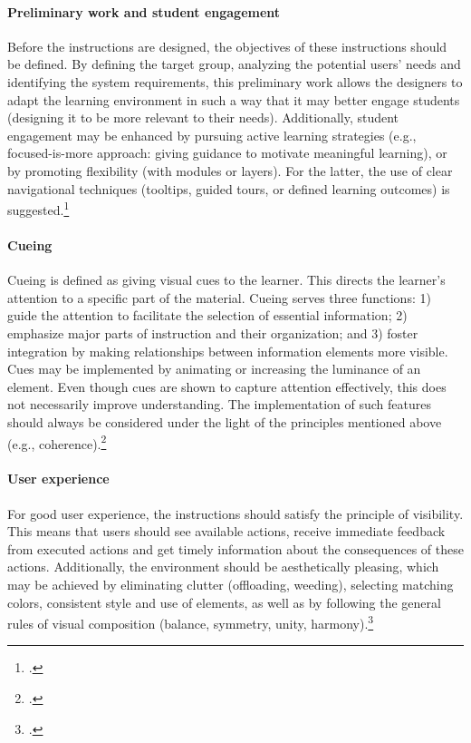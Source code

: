 \paragraph{Preliminary work and student engagement} Before the instructions are designed, the objectives of these instructions should be defined. By defining the target group, analyzing the potential users' needs and identifying the system requirements, this preliminary work allows the designers to adapt the learning environment in such a way that it may better engage students (designing it to be more relevant to their needs). Additionally, student engagement may be enhanced by pursuing active learning strategies (e.g., focused-is-more approach: giving guidance to motivate meaningful learning), or by promoting flexibility (with modules or layers). For the latter, the use of clear navigational techniques (tooltips, guided tours, or defined learning outcomes) is suggested.\footcites[Cf.][p.202]{BlummerBestPracticesCreating2009}

\paragraph{Cueing} Cueing is defined as giving visual cues to the learner. This directs the learner's attention to a specific part of the material. Cueing serves three functions: 1) guide the attention to facilitate the selection of essential information; 2) emphasize major parts of instruction and their organization; and 3) foster integration by making relationships between information elements more visible. Cues may be implemented by animating or increasing the luminance of an element. Even though cues are shown to capture attention effectively, this does not necessarily improve understanding. The implementation of such features should always be considered under the light of the principles mentioned above (e.g., coherence).\footcites[Cf.][p.114 et seqq]{deKoningFrameworkAttentionCueing2009}[cf.][chapter 2, paragraph 14]{ClarkElearningscienceinstruction2016}

\paragraph{User experience} For good user experience, the instructions should satisfy the principle of visibility. This means that users should see available actions, receive immediate feedback from executed actions and get timely information about the consequences of these actions. Additionally, the environment should be aesthetically pleasing, which may be achieved by eliminating clutter (offloading, weeding), selecting matching colors, consistent style and use of elements, as well as by following the general rules of visual composition (balance, symmetry, unity, harmony).\footcites[Cf.][p. 16 et seqq]{LeeScreenDesignGuidelines1999}[cf.][p. 16 et seqq]{Nadelhoffer10BestPractices}[cf.][p.20]{KirshInteractivitymultimediainterfaces1997}

